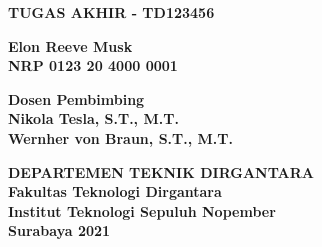 \begin{flushleft}

  \sffamily

  \noindent\textbf{TUGAS AKHIR - TD123456}
  \vspace{6ex}

  \vspace{4ex}

  \noindent\textbf{Elon Reeve Musk} \\
  \textbf{NRP 0123 20 4000 0001}
  \vspace{2ex}

  \noindent\textbf{Dosen Pembimbing} \\
  \textbf{Nikola Tesla, S.T., M.T.} \\
  \textbf{Wernher von Braun, S.T., M.T.}
  \vspace{6ex}

  \noindent\textbf{DEPARTEMEN TEKNIK DIRGANTARA} \\
  \textbf{Fakultas Teknologi Dirgantara} \\
  \textbf{Institut Teknologi Sepuluh Nopember} \\
  \textbf{Surabaya 2021}

\end{flushleft}

\restoregeometry